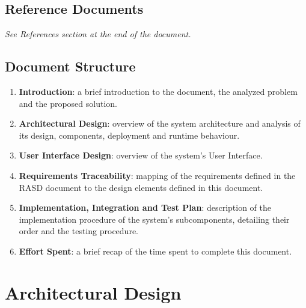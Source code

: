 \documentclass[10pt]{article} %
\begin{document}
\subsection{Reference Documents}
\textit{See References section at the end of the document.}
\subsection{Document Structure}
\begin{enumerate}
    \item \textbf{Introduction}: a brief introduction to the document, the analyzed problem and the proposed solution.
    \item \textbf{Architectural Design}: overview of the system architecture and analysis of its design, components, deployment and runtime behaviour.
    \item \textbf{User Interface Design}: overview of the system's User Interface.
    \item \textbf{Requirements Traceability}: mapping of the requirements defined in the RASD document to the design elements defined in this document.
    \item \textbf{Implementation, Integration and Test Plan}: description of the implementation procedure of the system's subcomponents, detailing their order and the testing procedure.
    \item \textbf{Effort Spent}: a brief recap of the time spent to complete this document.
\end{enumerate}
\newpage
\section{Architectural Design}
\end{document}

